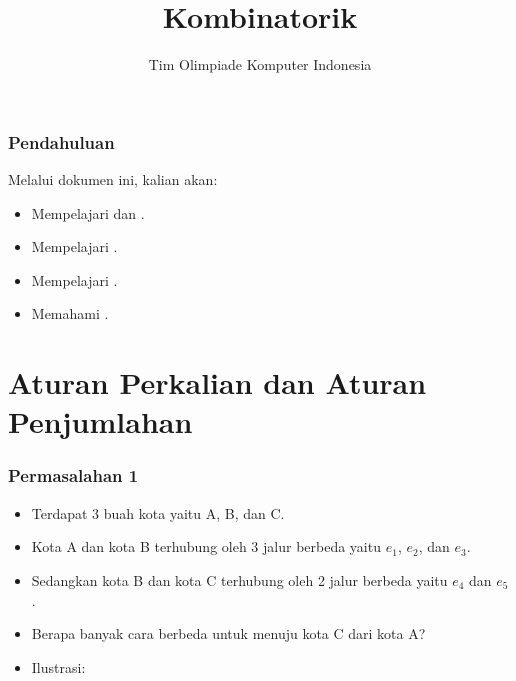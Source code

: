 
\usepackage{tikz}

\title{Kombinatorik}
\author{Tim Olimpiade Komputer Indonesia}
\date{}



\begin{frame}
\titlepage
\end{frame}

\begin{frame}
\frametitle{Pendahuluan}
Melalui dokumen ini, kalian akan:
\begin{itemize}
  \item Mempelajari  dan .
  \item Mempelajari .
  \item Mempelajari .
  \item Memahami .
\end{itemize}
\end{frame}

\section{Aturan Perkalian dan Aturan Penjumlahan}
\frame{\sectionpage}

\begin{frame}
\frametitle{Permasalahan 1}
\begin{itemize}
  \item Terdapat 3 buah kota yaitu A, B, dan C.
  \item Kota A dan kota B terhubung oleh 3 jalur berbeda yaitu $e_{1}$, $e_{2}$, dan $e_{3}$.
  \item Sedangkan kota B dan kota C terhubung oleh 2 jalur berbeda yaitu $e_{4}$ dan $e_{5}$.
  \item Berapa banyak cara berbeda untuk menuju kota C dari kota A?
  \item Ilustrasi: 
  \newline
\end{itemize}
\end{frame}

